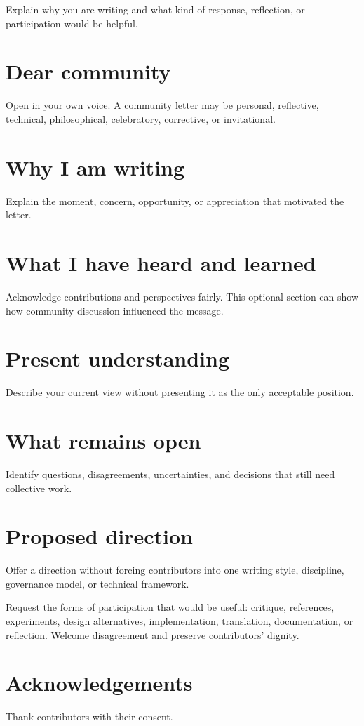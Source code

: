 \documentclass[11pt,a4paper]{article}
\begin{document}
\MakeGenesisTitle
\begin{GenesisAbstract}
Explain why you are writing and what kind of response, reflection, or participation would
be helpful.
\end{GenesisAbstract}
\section{Dear community}
Open in your own voice. A community letter may be personal, reflective, technical,
philosophical, celebratory, corrective, or invitational.
\section{Why I am writing}
Explain the moment, concern, opportunity, or appreciation that motivated the letter.
\section{What I have heard and learned}
Acknowledge contributions and perspectives fairly. This optional section can show how
community discussion influenced the message.
\section{Present understanding}
Describe your current view without presenting it as the only acceptable position.
\section{What remains open}
Identify questions, disagreements, uncertainties, and decisions that still need collective work.
\section{Proposed direction}
Offer a direction without forcing contributors into one writing style, discipline, governance
model, or technical framework.
\begin{GenesisAction}
Request the forms of participation that would be useful: critique, references, experiments,
design alternatives, implementation, translation, documentation, or reflection. Welcome
disagreement and preserve contributors' dignity.
\end{GenesisAction}
\section*{Acknowledgements}
Thank contributors with their consent.
\end{document}
